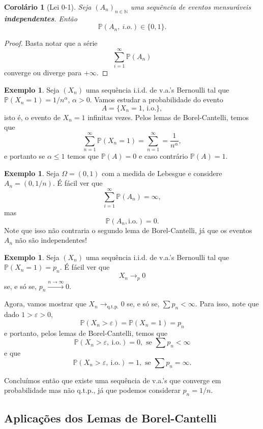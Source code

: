 \documentclass[12pt,a4paper,oneside]{book}
\newtheorem{corollary}[theorem]{Corol\'ario}
\theoremstyle{definition}
\newtheorem{example}[theorem]{Exemplo}
\theoremstyle{remark}
\numberwithin{equation}{section}
\newcommand{\e}{\varepsilon}
\newcommand{\N}{\mathbb{N}}
\newcommand{\pr}{\mathbb{P}}
\newcommand{\rarrowlimn}{\xrightarrow{n\rightarrow \infty}}
\begin{document}
\begin{corollary}[Lei 0-1]
Seja $(A_n)_{n\in \N}$ uma sequência de eventos mensuráveis \textbf{independentes}. Então
$$\pr(A_n,\ i.o.)\in \{0,1\}. $$
\end{corollary}

\begin{proof}
Basta notar que a série 
$$\sum_{i=1}^\infty\pr(A_n)$$
converge ou diverge para $+\infty$.
\end{proof}


\begin{example}
Seja $(X_n)$ uma sequência i.i.d. de  v.a.'s Bernoulli tal  que $\pr(X_n=1)=1/n^\alpha$, $\alpha>0.$ Vamos estudar a probabilidade  do evento 
$$A = \{X_n = 1 \textrm{, i.o.} \}, $$
isto é, o evento de $X_n=1$ infinitas vezes. 
Pelos lemas de Borel-Cantelli, temos que
$$\sum_{n=1}^\infty \pr(X_n=1) = \sum_{n=1}^\infty = \dfrac{1}{n^\alpha}, $$
e portanto se $\alpha\leq 1$ temos que $\pr(A)=0$ e caso contrário $\pr(A)=1$. \end{example}

\begin{example}
Seja $\Omega = (0,1)$ com a medida de Lebesgue e considere $A_n = (0,1/n)$. É fácil ver que 
$$\sum_{i=1}^\infty \pr(A_n) = \infty,$$
mas 
$$\pr (A_n, \textrm{i.o.}) = 0. $$
Note que isso não contraria o segundo lema de Borel-Cantelli, já que os eventos $A_n$ não são independentes!

\end{example}

\begin{example}
Seja $(X_n)$ uma sequência i.i.d. de v.a.'s Bernoulli tal que $\pr(X_n=1)=p_n$. É fácil ver que $$X_n \rightarrow_p 0 $$
se, e só se, $p_n\rarrowlimn 0$. 

Agora, vamos mostrar que $X_n \rightarrow_{\textrm{q.t.p.}} 0$ se, e só se, $\sum p_n <\infty$.
Para isso, note que dado  $1>\e>0$, 
$$\pr(X_n>\e) = \pr(X_n=1) = p_n$$
e portanto, pelos lemas de Borel-Cantelli, temos que
$$\pr(X_n>\e,\ \textrm{i.o.})=0, \textrm{ se } \sum p_n <\infty$$ 
e que  
$$\pr(X_n>\e,\ \textrm{i.o.})=1, \textrm{ se } \sum p_n =\infty.$$ 

Concluímos então que existe uma sequência de v.a.'s que converge em probabilidade mas não q.t.p., já que podemos considerar $p_n=1/n.$
\end{example}



\subsection{Aplicações dos Lemas de Borel-Cantelli}
\end{document}
